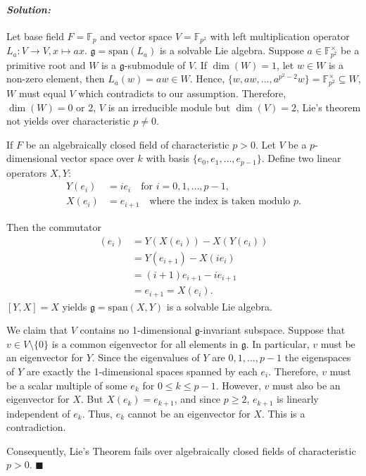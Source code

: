 \documentclass[12pt, a4paper]{article}
\newenvironment{solution}
  {\paragraph{\textit{Solution:}}\par\medskip}
  {\hfill$\blacksquare$\vspace{0.1cm}}
\begin{document}
\begin{solution}
  Let base field $F =\mathbb{F}_p$ and vector space $V = \mathbb{F}_{p^2}$ with left multiplication operator $L_{a}: V \to V, x \mapsto ax$. $\mathfrak{g} = \text{span}(L_a)$ is a solvable Lie algebra. Suppose $a\in \mathbb{F}^\times_{p^2}$ be a primitive root and $W$ is a $\mathfrak{g}$-submodule of $V$. 
  If $\dim (W) = 1$, let $w\in W$ is a non-zero element, then $L_a(w) = aw \in W$. Hence, $\{w,aw,...,a^{p^2-2}w\} = \mathbb{F}^\times_{p^2}\subseteq W$, $W$ must equal $V$ which contradicts to our assumption. Therefore, $\dim(W) = 0 \text{ or } 2$, $V$ is an irreducible module but $\dim(V) = 2$, Lie's theorem not yields over characteristic $p\neq 0$.



If $F$ be an algebraically closed field of characteristic $p > 0$. 
Let $V$ be a $p$-dimensional vector space over $k$ with basis $\{e_0, e_1, \dots, e_{p-1}\}$. 
Define two linear operators $X, Y$:
\begin{align*}
    Y(e_i) &= i e_i \quad \text{for } i = 0, 1, \dots, p-1, \\
    X(e_i) &= e_{i+1} \quad \text{where the index is taken modulo } p.
\end{align*}

Then the commutator 
\begin{align*}
    [Y, X](e_i) &= Y(X(e_i)) - X(Y(e_i)) \\
    &= Y(e_{i+1}) - X(i e_i) \\
    &= (i+1)e_{i+1} - i e_{i+1} \\
    &= e_{i+1} = X(e_i).
\end{align*}
$[Y,X]=X$ yields $\mathfrak{g} = \text{span}(X,Y)$ is a solvable Lie algebra.

We claim that $V$ contains no 1-dimensional $\mathfrak{g}$-invariant subspace. 
Suppose that $v \in V \setminus \{0\}$ is a common eigenvector for all elements in $\mathfrak{g}$. In particular, $v$ must be an eigenvector for $Y$.
Since the eigenvalues of $Y$ are $0, 1, \dots, p-1$ the eigenspaces of $Y$ are exactly the 1-dimensional spaces spanned by each $e_i$. 
Therefore, $v$ must be a scalar multiple of some $e_k$ for $0 \le k \le p-1$.
However, $v$ must also be an eigenvector for $X$. But $X(e_k) = e_{k+1}$, and since $p \ge 2$, $e_{k+1}$ is linearly independent of $e_k$. Thus, $e_k$ cannot be an eigenvector for $X$. This is a contradiction.

Consequently,  Lie's Theorem fails over algebraically closed fields of characteristic $p>0$.
\end{solution}
\end{document}
